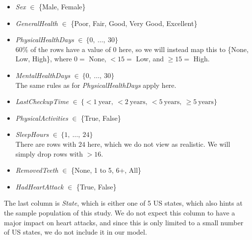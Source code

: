 \documentclass{article}
\begin{document}
\begin{itemize}
    \item \textit{Sex} $\in$ \{Male, Female\}
    \item \textit{GeneralHealth} $\in$ \{Poor, Fair, Good, Very Good, Excellent\}
    \item \textit{PhysicalHealthDays} $\in\ \{ 0,\ \dots,\ 30 \}$\\
    $60\%$ of the rows have a value of $0$ here, so we will instead map this to
    \{None, Low, High\}, where $0 = $ None, $<15 = $ Low, and $\geq15 =$ High.
    \item \textit{MentalHealthDays}  $\in\ \{ 0,\ \dots,\ 30 \}$\\
    The same rules as for \textit{PhysicalHealthDays} apply here.
    \item \textit{LastCheckupTime} $\in\ \{<1\ \text{year},\ <2\ \text{years},\ <5\ \text{years},\ \geq 5\ \text{years}\}$
    \item \textit{PhysicalActivities} $\in$ \{True, False\}
    \item \textit{SleepHours}  $\in\ \{ 1,\ \dots,\ 24 \}$\\
    There are rows with $24$ here, which we do not view as realistic.
    We will simply drop rows with $>16$.
    \item \textit{RemovedTeeth} $\in$ \{None, 1 to 5, 6+, All\}
    \item \textit{HadHeartAttack} $\in$ \{True, False\}
\end{itemize}

The last column is \textit{State}, which is either one of 5 US states,
which also hints at the sample population of this study.
We do not expect this column to have a major impact on heart attacks,
and since this is only limited to a small number of US states, we do not include it in our model.
\end{document}
